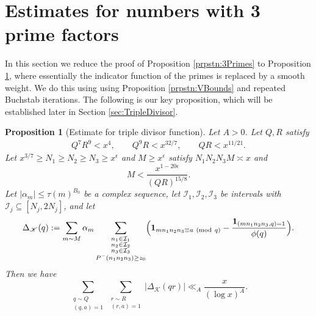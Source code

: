 \documentclass[10pt]{amsart}
\theoremstyle{plain}
\newtheorem{prpstn}[thrm]{Proposition}
\numberwithin{equation}{section}
\newcommand{\Mod}[1]{\ (\mathrm{mod}\ #1)}
\begin{document}
\section{Estimates for numbers with 3 prime factors}\label{sec:3Primes}
%
%
%
%
In this section we reduce the proof of Proposition \ref{prpstn:3Primes} to Proposition \ref{prpstn:TripleDivisor}, where essentially the indicator function of the primes is replaced by a smooth weight. We do this using  using Proposition \ref{prpstn:VBounds} and repeated Buchstab iterations. The following is our key proposition, which will be established later in Section \ref{sec:TripleDivisor}.
%
%
%
%
%
%
%
%
\begin{prpstn}[Estimate for triple divisor function]\label{prpstn:TripleDivisor}
Let $A>0$. Let $Q,R$ satisfy
\begin{align*}
Q^7 R^9<x^4,\qquad Q^9 R<x^{32/7},\qquad Q R<x^{11/21}.
\end{align*}
Let $x^{3/7}\ge N_1\ge N_2\ge N_3\ge x^\epsilon$ and $M\ge x^\epsilon$ satisfy  $N_1N_2N_3M\asymp x$ and
\[
M<\frac{x^{1-20\epsilon}}{( Q R)^{15/8}}.
\]
Let $|\alpha_m|\le \tau(m)^{B_0}$ be a complex sequence, let $\mathcal{I}_1,\mathcal{I}_2,\mathcal{I}_3$ be intervals with $\mathcal{I}_j\subseteq[N_j,2N_j]$, and let
\[
\Delta_{\mathscr{K}}(q):=\sum_{m\sim M}\alpha_m\sum_{\substack{n_1\in \mathcal{I}_1\\n_2\in \mathcal{I}_2\\ n_3\in \mathcal{I}_3\\ P^-(n_1n_2n_3)\ge z_0}}\Bigl(\mathbf{1}_ {m n_1n_2n_3\equiv a\Mod{q}}-\frac{\mathbf{1}_{(m n_1 n_2 n_3,q)=1}}{\phi(q)}\Bigr).
\]
Then we have
\[
\sum_{\substack{q\sim Q\\ (q,a)=1}}\sum_{\substack{r\sim R\\ (r,a)=1}}|\Delta_{\mathscr{K}}(q r)|\ll_A \frac{x}{(\log{x})^{A}}.
\]
\end{prpstn}
%
%
%
%
\end{document}
